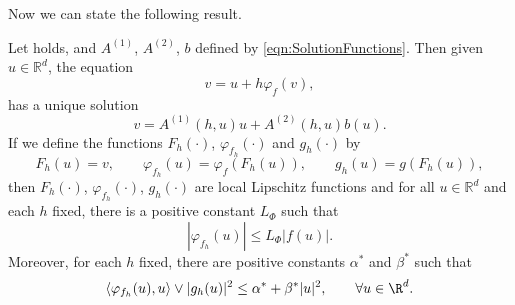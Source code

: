 Now we can state the following result.
\begin{lem}\label{lem:PhiFhProp}
	Let  holds, and $A^{(1)}$, $A^{(2)}$, $b$  
	defined by 
	\eqref{eqn:SolutionFunctions}. Then given $u\in\mathbb{R}^d$, the equation
	\begin{equation}\label{eqn:varphiEquation}
		v = u + h \varphi_f(v),
	\end{equation}
	has a unique solution 
	\begin{equation}\label{eqn:varphiEqnSolution}
		v = A^{(1)}(h,u)u +A^{(2)}(h,u) b(u)	.
	\end{equation}
%
	If we define the functions
	$F_h(\cdot)$, $\varphi_{f_h}(\cdot)$ and $g_h(\cdot)$ by
	\begin{equation}\label{eqn:FunctionshDefinition}
		F_h(u) = v,
			\qquad 
			\varphi_{f_h}(u) =\varphi_{f}(F_h(u)),
			\qquad
			g_h(u) = g(F_h(u)),
	\end{equation}
	then $F_h(\cdot)$, $\varphi_{f_h}(\cdot)$, $g_h(\cdot)$ are local Lipschitz functions 
	and for all $u\in \mathbb{R}^d$ and each $h$ fixed, there is a positive constant $L_{\Phi}$ such that
	\begin{equation}\label{eqn:PhifhFbound}
		|\varphi_{f_h}(u)|\leq L_{\Phi} |f(u)|. 
	\end{equation} 
	Moreover, for each $h$ fixed,
	 there are positive constants $\alpha^*$ and  $\beta^*$ such that
	\begin{equation}\label{eqn:h-MonotoneCondition}
		\innerprod{\varphi_{f_h}(u)}{u} \vee |g_h(u)|^2 \leq \alpha^* + \beta^* |u|^2, 
		\qquad
		\forall u \in \R^d.
	\end{equation}
\end{lem}
%

